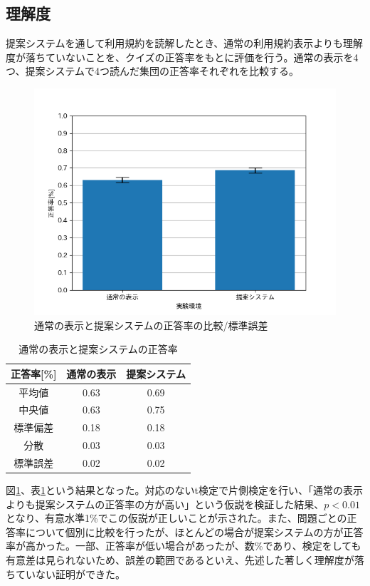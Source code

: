\subsection{理解度}
提案システムを通して利用規約を読解したとき、通常の利用規約表示よりも理解度が落ちていないことを、クイズの正答率をもとに評価を行う。通常の表示を4つ、提案システムで4つ読んだ集団の正答率それぞれを比較する。
\begin{figure}[h]
  \begin{center}
      \includegraphics[width=13cm]{img/answerne4.png}
      \caption{通常の表示と提案システムの正答率の比較/標準誤差}
      \label{img:通常の表示と提案システムの正答率の比較/標準誤差}
  \end{center}
\end{figure}
\begin{table}[h]
  \caption{通常の表示と提案システムの正答率}
  \label{tab:通常の表示と提案システムの正答率}
  \centering
  \begin{tabular}{ccc}
    \hline
    正答率[\%]  & 通常の表示  &  提案システム  \\
    \hline \hline
    平均値  & 0.63  & 0.69 \\
    中央値  & 0.63   & 0.75 \\
    標準偏差  & 0.18  & 0.18 \\
    分散  &  0.03  &  0.03 \\
    標準誤差  &  0.02  &  0.02 \\
    \hline
  \end{tabular}
\end{table}
図\ref{img:通常の表示と提案システムの正答率の比較/標準誤差}、表\ref{tab:通常の表示と提案システムの正答率}という結果となった。対応のないt検定で片側検定を行い、「通常の表示よりも提案システムの正答率の方が高い」という仮説を検証した結果、$p<0.01$となり、有意水準1\%でこの仮説が正しいことが示された。また、問題ごとの正答率について個別に比較を行ったが、ほとんどの場合が提案システムの方が正答率が高かった。一部、正答率が低い場合があったが、数\%であり、検定をしても有意差は見られないため、誤差の範囲であるといえ、先述した著しく理解度が落ちていない証明ができた。


